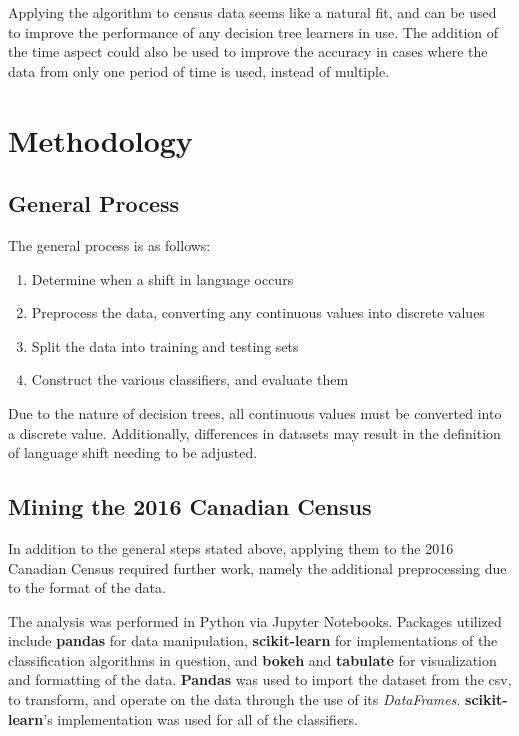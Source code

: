 \documentclass[10pt, conference, compsocconf]{IEEEtran}
\begin{document}
Applying the algorithm to census data seems like a natural fit, and can be used to improve the performance of any decision tree learners in use. The addition of the time aspect could also be used to improve the accuracy in cases where the data from only one period of time is used, instead of multiple.


\section{Methodology}

\subsection{General Process}
The general process is as follows:
\begin{enumerate}
	\item Determine when a shift in language occurs
	\item Preprocess the data, converting any continuous values into discrete values
	\item Split the data into training and testing sets
	\item Construct the various classifiers, and evaluate them
\end{enumerate}

Due to the nature of decision trees, all continuous values must be converted into a discrete value. Additionally, differences in datasets may result in the definition of language shift needing to be adjusted.

\subsection{Mining the 2016 Canadian Census}
In addition to the general steps stated above, applying them to the 2016 Canadian Census required further work, namely the additional preprocessing due to the format of the data.

The analysis was performed in Python via Jupyter Notebooks.  Packages utilized include \textbf{pandas} for data manipulation, \textbf{scikit-learn} for implementations of the classification algorithms in question, and \textbf{bokeh} and \textbf{tabulate} for visualization and formatting of the data.
\textbf{Pandas} was used to import the dataset from the csv, to transform, and operate on the data through the use of its \textit{DataFrames}.
\textbf{scikit-learn}'s implementation was used for all of the classifiers.
\end{document}
